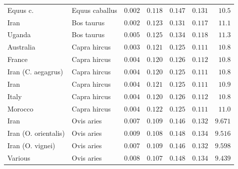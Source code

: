 \documentclass{article}
\begin{document}
\begin{center}
\begin{longtable*}{|l|l|r|r|r|r|r|}
            \bottomrule
            \endlastfoot
             Equus c. &      Equus caballus &               $ 0.002$ &                    $ 0.118$ &  $ 0.147$ &           $ 0.131$ &     $  10.5$ \\
            Iran &          Bos taurus &               $ 0.002$ &                    $ 0.123$ &  $ 0.131$ &           $ 0.117$ &     $  11.1$ \\
            Uganda &          Bos taurus &               $ 0.005$ &                    $ 0.125$ &  $ 0.134$ &           $ 0.118$ &     $  11.3$ \\
             Australia &        Capra hircus &               $ 0.003$ &                    $ 0.121$ &  $ 0.125$ &           $ 0.111$ &     $  10.8$ \\
             France &        Capra hircus &               $ 0.004$ &                    $ 0.120$ &  $ 0.126$ &           $ 0.112$ &     $  10.8$ \\
             Iran (C. aegagrus) &        Capra hircus &               $ 0.004$ &                    $ 0.120$ &  $ 0.125$ &           $ 0.111$ &     $  10.8$ \\
             Iran &        Capra hircus &               $ 0.004$ &                    $ 0.121$ &  $ 0.125$ &           $ 0.111$ &     $  10.9$ \\
             Italy &        Capra hircus &               $ 0.004$ &                    $ 0.120$ &  $ 0.126$ &           $ 0.112$ &     $  10.8$ \\
             Morocco &        Capra hircus &               $ 0.004$ &                    $ 0.122$ &  $ 0.125$ &           $ 0.111$ &     $  11.0$ \\
            Iran &          Ovis aries &               $ 0.007$ &                    $ 0.109$ &  $ 0.146$ &           $ 0.132$ &     $ 9.671$ \\
            Iran (O. orientalis) &          Ovis aries &               $ 0.009$ &                    $ 0.108$ &  $ 0.148$ &           $ 0.134$ &     $ 9.516$ \\
            Iran (O. vignei) &          Ovis aries &               $ 0.007$ &                    $ 0.109$ &  $ 0.146$ &           $ 0.132$ &     $ 9.598$ \\
            Various &          Ovis aries &               $ 0.008$ &                    $ 0.107$ &  $ 0.148$ &           $ 0.134$ &     $ 9.439$ \\

\end{longtable*}
\end{center}
\end{document}
